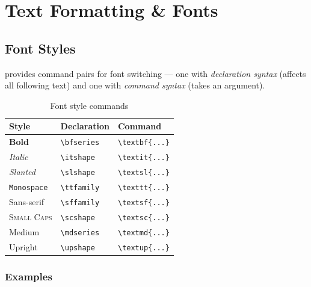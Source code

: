 
\chapter{Text Formatting \& Fonts}

\section{Font Styles}

\latex{} provides command pairs for font switching — one with \emph{declaration syntax} (affects all following text) and one with \emph{command syntax} (takes an argument).

\begin{table}[H]
\centering
\begin{tabular}{lll}
\toprule
\textbf{Style} & \textbf{Declaration} & \textbf{Command} \\
\midrule
\textbf{Bold}          & \verb|\bfseries|  & \verb|\textbf{...}| \\
\textit{Italic}        & \verb|\itshape|   & \verb|\textit{...}| \\
\textsl{Slanted}       & \verb|\slshape|   & \verb|\textsl{...}| \\
\texttt{Monospace}     & \verb|\ttfamily|  & \verb|\texttt{...}| \\
\textsf{Sans-serif}    & \verb|\sffamily|  & \verb|\textsf{...}| \\
\textsc{Small Caps}    & \verb|\scshape|   & \verb|\textsc{...}| \\
\textmd{Medium}        & \verb|\mdseries|  & \verb|\textmd{...}| \\
Upright                & \verb|\upshape|   & \verb|\textup{...}| \\
\bottomrule
\end{tabular}
\caption{Font style commands}
\end{table}

\subsection{Examples}

